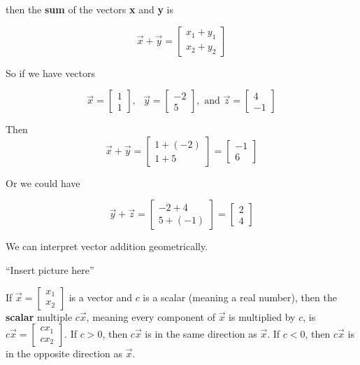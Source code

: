 then the \textbf{sum} of the vectors \textbf{x} and \textbf{y} is

$$ \overrightarrow{x} + \overrightarrow{y} = \begin{bmatrix}x_1+y_1\\x_2+y_2\end{bmatrix} $$

\newpage

So if we have vectors 

$$ \overrightarrow{x} = \begin{bmatrix}1\\1\end{bmatrix}, \text{ } \overrightarrow{y} = \begin{bmatrix}-2\\5\end{bmatrix}, \text{ and } \overrightarrow{z} = \begin{bmatrix}4\\-1\end{bmatrix}$$

Then $$ \overrightarrow{x} + \overrightarrow{y} = \begin{bmatrix}1+(-2)\\1+5  \end{bmatrix} = \begin{bmatrix}
-1\\6
\end{bmatrix} $$

Or we could have

$$ \overrightarrow{y} + \overrightarrow{z} = \begin{bmatrix}-2+4\\5+(-1)  \end{bmatrix} = \begin{bmatrix}
2\\4
\end{bmatrix} $$

\newpage

We can interpret vector addition geometrically.

``Insert picture here''


\newpage

If $\overrightarrow{x} = \begin{bmatrix}
x_1\\x_2
\end{bmatrix}$ is a vector and $c$ is a scalar (meaning a real number), then the \textbf{scalar} multiple $c\overrightarrow{x}$, meaning every component of $\overrightarrow{x}$ is multiplied by $c$, is $c\overrightarrow{x} = \begin{bmatrix}
cx_1\\cx_2
\end{bmatrix}$. If $c>0$, then $c\overrightarrow{x}$ is in the same direction as $\overrightarrow{x}$. If $c<0$, then $c\overrightarrow{x}$ is in the opposite direction as $\overrightarrow{x}$.

